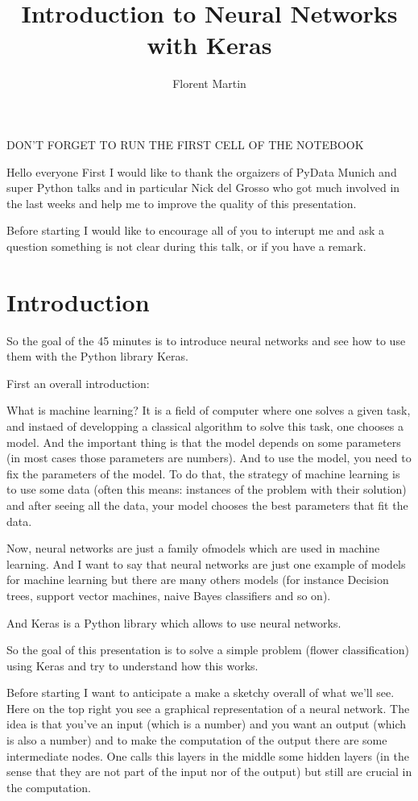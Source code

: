 \documentclass{article}
\title{Introduction to Neural Networks with Keras}
\author{Florent Martin}
\date{}
\begin{document}
\maketitle



 DON'T FORGET TO RUN THE FIRST CELL OF THE NOTEBOOK 
 

Hello everyone
First I would like to thank the orgaizers of PyData Munich and super Python talks and in particular 
Nick del Grosso who got much involved in the last weeks and  help me to improve the quality of this presentation.

Before starting I would like to encourage all of you 
to interupt me and ask a question something is not clear during this talk,
or if you have a remark.

 \section*{Introduction}


So the goal of the 45 minutes is to introduce neural networks and see how to use them with the Python library Keras.

First an overall introduction: 

What is machine learning? 
It is a field of computer where one solves a given task, and instaed of 
developping a classical algorithm to solve this task, one  chooses a model. 
And the important thing is that the model   depends on some  parameters 
(in most cases those parameters are numbers).
And to use the model, 
you need to fix the parameters of the model.
To do that, the strategy of machine learning is to use some data 
(often this means: instances of the problem with their solution)
and after seeing all the data, your model
chooses the best parameters that fit the data.

Now, neural networks are just a family ofmodels which are used in machine learning.
And I want to say that neural networks are just one example of models for machine learning 
but there are many others models 
(for instance Decision trees, support vector machines, naive Bayes classifiers and so on).

And Keras is a Python library which allows to use neural networks.

So the goal of this presentation is to solve a  simple problem (flower classification) 
using Keras and try to understand how this works.

Before starting I want to anticipate a make a sketchy overall of what we'll see.
Here on the top right you see a graphical representation of a neural network.
The idea is that you've an input (which is a number) and you want an output (which is also a number) and to make the computation of the output there are some intermediate nodes. 
One calls this layers in the middle some hidden layers (in the sense that they are not part of the input 
nor of the output) but still are crucial in the computation.
\end{document}
